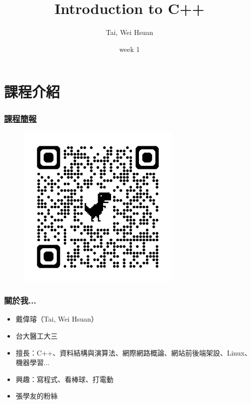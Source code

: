 \documentclass[xcolor=dvipsnames]{beamer}
\title{Introduction to C++}
\author{Tai, Wei Hsuan}
\date{week 1}
\begin{document}
	\begin{frame}
		\titlepage
	\end{frame}

    \section{課程介紹}

    \begin{frame}
        \frametitle{\href{https://drive.google.com/drive/folders/14Tkn-rddw0k1obeOxkWi00S43M0e9wlW?usp=sharing}{課程簡報}}
        \begin{figure}
            \centering
            \includegraphics[width=0.7\textwidth]{src/qrcode.png}
        \end{figure}
    \end{frame}

    \begin{frame}
        \frametitle{關於我...}
        \begin{itemize}
            \item 戴偉璿（Tai, Wei Hsuan）
            \item 台大醫工大三
            \item 擅長：C++、資料結構與演算法、網際網路概論、網站前後端架設、Linux、機器學習...
            \item 興趣：寫程式、看棒球、打電動
            \item 張學友的粉絲
        \end{itemize}
    \end{frame}
\end{document}
